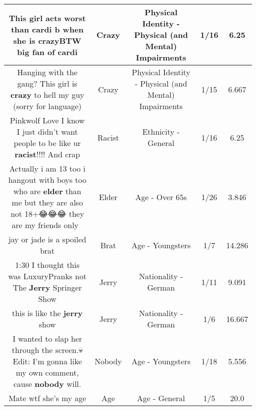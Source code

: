 \documentclass[11pt]{article}
\newlength\mylength
\begin{document}
\begin{center}
\begin{longtable}{|C{.65\mylength}|C{.30\mylength}|C{.12\mylength}|C{.12\mylength}|C{.12\mylength}|}
  \small This girl acts worst than cardi b when she is \textbf{crazy}BTW big fan of cardi\normalsize   & Crazy & Physical Identity - Physical (and Mental) Impairments & 1/16 & 6.25 \\  \hline
  \small Hanging with the gang? This girl is \textbf{crazy} to hell my guy (sorry for language)\normalsize   & Crazy & Physical Identity - Physical (and Mental) Impairments & 1/15 & 6.667 \\  \hline
  \small Pinkwolf Love I know I just didn't want people to be like ur \textbf{racist}!!!! And crap\normalsize   & Racist & Ethnicity - General & 1/16 & 6.25 \\  \hline
  \small Actually i am 13 too i hangout with boys too who are \textbf{elder} than me but they are also not 18+😂😂😂 they are my friends only🐸🐸\normalsize   & Elder & Age - Over 65s & 1/26 & 3.846 \\  \hline
  \small jay or jade is a spoiled brat\normalsize   & Brat & Age - Youngsters & 1/7 & 14.286 \\  \hline
  \small 1:30 I thought this was LuxuryPranks not The \textbf{Jerry} Springer Show\normalsize   & Jerry & Nationality - German & 1/11 & 9.091 \\  \hline
  \small this is like the \textbf{jerry} show\normalsize   & Jerry & Nationality - German & 1/6 & 16.667 \\  \hline
  \small I wanted to slap her through the screen.💀Edit: I'm gonna like my own comment, cause \textbf{nobody} will.\normalsize   & Nobody & Age - Youngsters & 1/18 & 5.556 \\  \hline
  \small Mate wtf she's my age\normalsize   & Age & Age - General & 1/5 & 20.0 \\  \hline

\end{longtable}
\end{center}
\end{document}

